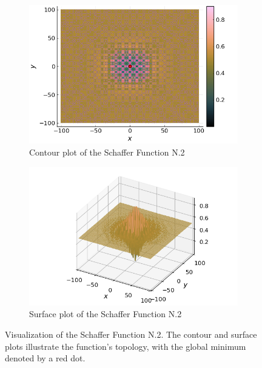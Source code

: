   \begin{figure}[ht!]
    \centering
    \begin{subfigure}[b]{0.45\textwidth}
      \centering
      \includegraphics[width=\textwidth]
        {img/test_functions/schaffer_2_contour.png}
      \caption{Contour plot of the Schaffer Function N.2}
    \end{subfigure}
    \hfill
    \begin{subfigure}[b]{0.45\textwidth}
      \centering
      \includegraphics[width=\textwidth]
        {img/test_functions/schaffer_2_surface.png}
      \caption{Surface plot of the Schaffer Function N.2}
    \end{subfigure}
    \caption{
      Visualization of the Schaffer Function N.2.
      The contour and surface plots illustrate the function's topology, with the
      global minimum denoted by a red dot.
    }
    \label{fig:app:test:schaffer_2}
  \end{figure}
